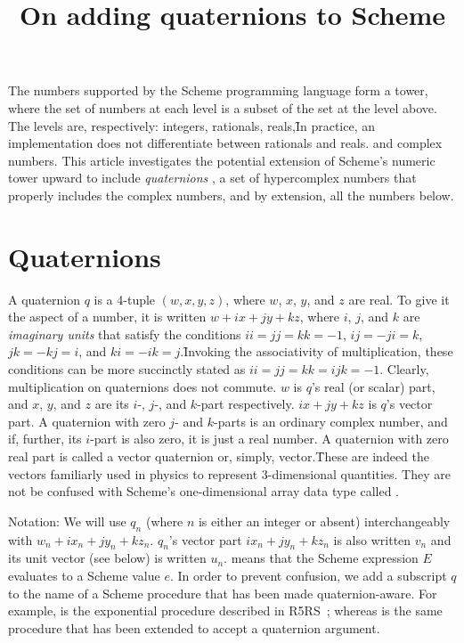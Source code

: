 

\title{On adding quaternions to Scheme}

\ifx\shipout\undefined
\centerline{}
\fi

\centerline{}

\bigskip

\n The numbers supported by the Scheme programming
language form a tower, where the set of numbers at each
level is a subset of the set at the level above.  The
levels are, respectively: integers, rationals,
reals,\f{In practice, an implementation does not
differentiate between rationals and reals.}
and complex numbers.
This article investigates the potential extension of
Scheme's numeric tower upward to include {\em
quaternions}
\cite{onquat}, a set of hypercomplex numbers that
properly includes the complex numbers, and by
extension, all the numbers below.

\section{Quaternions}

A quaternion $q$ is a 4-tuple $(w,x,y,z)$, where $w$,
$x$, $y$, and $z$ are real.  To give it the aspect of a
number, it is written $w + ix + jy + kz$, where $i$,
$j$, and $k$ are {\em imaginary units} that satisfy the
conditions $ii = jj = kk = -1$, $ij = -ji = k$, $jk =
-kj = i$, and $ki = -ik = j$.\f{Invoking the
associativity of multiplication, these conditions can
be more succinctly stated as $ii = jj = kk = ijk =
-1$.}   Clearly, multiplication on quaternions does not
commute.  $w$ is $q$'s real (or scalar) part, and
$x$, $y$, and $z$ are  its $i$-, $j$-, and
$k$-part respectively.  $ix + jy + kz$ is 
$q$'s vector part.  A quaternion with zero $j$- and
$k$-parts is an ordinary complex number, and if,
further, its $i$-part is also zero, it is just a real
number.  A quaternion with zero real part is called a
vector quaternion or, simply, vector.\f{These are
indeed the vectors familiarly used in physics to
represent 3-dimensional quantities.  They are not be confused
with Scheme's one-dimensional array data type called .} 

Notation:  We will use $q_n$ (where $n$ is either an
integer or absent) interchangeably with
$w_n+ix_n+jy_n+kz_n$.  $q_n$'s vector part
$ix_n+jy_n+kz_n$ is also written $v_n$ and its unit
vector (see below) is written $u_n$.   means that the Scheme expression $E$
evaluates to a Scheme value $e$.  In order to prevent
confusion, we add a subscript $q$ to the name of a
Scheme procedure that has been made quaternion-aware.
For example,  is the exponential procedure
described in R5RS~\cite{r5rs}; whereas 
is the same procedure that has been extended to accept
a quaternion argument.

